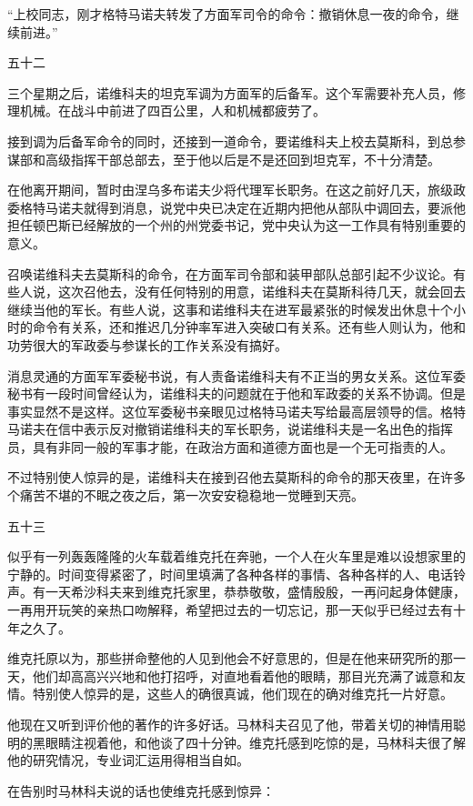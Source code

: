 “上校同志，刚才格特马诺夫转发了方面军司令的命令：撤销休息一夜的命令，继续前进。”

五十二

三个星期之后，诺维科夫的坦克军调为方面军的后备军。这个军需要补充人员，修理机械。在战斗中前进了四百公里，人和机械都疲劳了。

接到调为后备军命令的同时，还接到一道命令，要诺维科夫上校去莫斯科，到总参谋部和高级指挥干部总部去，至于他以后是不是还回到坦克军，不十分清楚。

在他离开期间，暂时由涅乌多布诺夫少将代理军长职务。在这之前好几天，旅级政委格特马诺夫就得到消息，说党中央已决定在近期内把他从部队中调回去，要派他担任顿巴斯已经解放的一个州的州党委书记，党中央认为这一工作具有特别重要的意义。

召唤诺维科夫去莫斯科的命令，在方面军司令部和装甲部队总部引起不少议论。有些人说，这次召他去，没有任何特别的用意，诺维科夫在莫斯科待几天，就会回去继续当他的军长。有些人说，这事和诺维科夫在进军最紧张的时候发出休息十个小时的命令有关系，还和推迟几分钟率军进入突破口有关系。还有些人则认为，他和功劳很大的军政委与参谋长的工作关系没有搞好。

消息灵通的方面军军委秘书说，有人责备诺维科夫有不正当的男女关系。这位军委秘书有一段时间曾经认为，诺维科夫的问题就在于他和军政委的关系不协调。但是事实显然不是这样。这位军委秘书亲眼见过格特马诺夫写给最高层领导的信。格特马诺夫在信中表示反对撤销诺维科夫的军长职务，说诺维科夫是一名出色的指挥员，具有非同一般的军事才能，在政治方面和道德方面也是一个无可指责的人。

不过特别使人惊异的是，诺维科夫在接到召他去莫斯科的命令的那天夜里，在许多个痛苦不堪的不眠之夜之后，第一次安安稳稳地一觉睡到天亮。

五十三

似乎有一列轰轰隆隆的火车载着维克托在奔驰，一个人在火车里是难以设想家里的宁静的。时间变得紧密了，时间里填满了各种各样的事情、各种各样的人、电话铃声。有一天希沙科夫来到维克托家里，恭恭敬敬，盛情殷殷，一再问起身体健康，一再用开玩笑的亲热口吻解释，希望把过去的一切忘记，那一天似乎已经过去有十年之久了。

维克托原以为，那些拼命整他的人见到他会不好意思的，但是在他来研究所的那一天，他们却高高兴兴地和他打招呼，对直地看着他的眼睛，那目光充满了诚意和友情。特别使人惊异的是，这些人的确很真诚，他们现在的确对维克托一片好意。

他现在又听到评价他的著作的许多好话。马林科夫召见了他，带着关切的神情用聪明的黑眼睛注视着他，和他谈了四十分钟。维克托感到吃惊的是，马林科夫很了解他的研究情况，专业词汇运用得相当自如。

在告别时马林科夫说的话也使维克托感到惊异：

